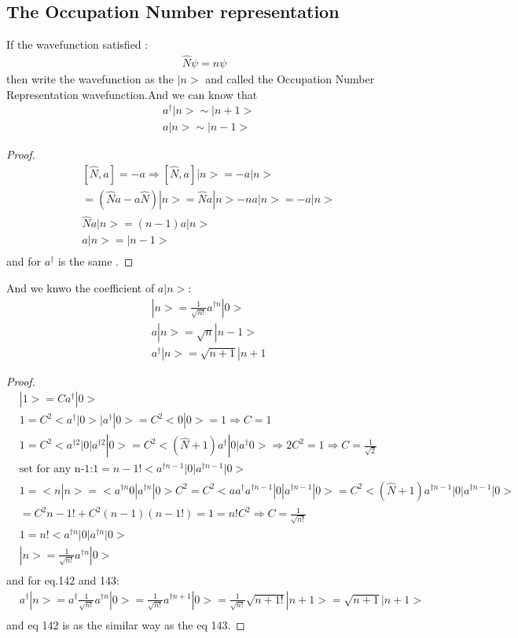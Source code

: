 \documentclass{article}
\begin{document}
\subsection{The Occupation Number representation}
If the wavefunction satisfied :
\begin{align}
\hat N \psi=n\psi
\end{align}
then write the wavefunction as the $|n>$ and called the Occupation Number Representation wavefunction.And we can know that
\begin{align}
&a^{\dagger}|n>\sim|n+1> \\
&a|n>\sim|n-1>
\end{align}

\begin{proof}
  \begin{align*}
  &[\hat N,a]=-a \Rightarrow [\hat N,a]|n>=-a|n>\\
  &=(\hat Na-a\hat N)|n>=\hat Na|n>-na|n>=-a|n> \\
  &\hat Na|n>=(n-1)a|n> \\
  &a|n>=|n-1> \\
  \end{align*}
  and for $a^{\dagger}$ is the same .
\end{proof}
And we knwo the coefficient of $a|n>$:
\begin{align}
  &|n>=\frac1{\sqrt{n!}}a^{\dagger n}|0> \\
  &a|n>=\sqrt{n}|n-1>\\
  &a^{\dagger}|n>=\sqrt{n+1}|n+1 
\end{align}

\begin{proof}
  \begin{align*}
    &|1>=Ca^{\dagger}|0> \\
    &1=C^2<a^{\dagger}|0>|a^{\dagger}|0>=C^2<0|0>=1\Rightarrow C=1 \\
    &1=C^2<a^{\dagger 2}|0|a^{\dagger 2}|0>=C^2<(\hat N+1)a^{\dagger }|0|a^{\dagger }0>\Rightarrow 2C^2=1\Rightarrow C=\frac1{\sqrt{2}} \\
    &\text{set for any n-1:}1={n-1!}<a^{\dagger n-1}|0|a^{\dagger n-1}|0> \\
    &1=<n|n>=<a^{\dagger n} 0|a^{\dagger n}|0>C^2=C^2<aa^{\dagger} a^{\dagger n-1}|0|a^{\dagger n-1}|0>=C^2<(\hat N+1)a^{\dagger n-1}|0|a^{\dagger n-1}|0> \\
    &=C^2 {n-1!}+C^2 (n-1)(n-1!)=1=n!C^2\Rightarrow C=\frac1{\sqrt{n!}} \\
    &1=n!<a^{\dagger n}|0|a^{\dagger n}|0> \\
    &|n>=\frac1{\sqrt{n!}}a^{\dagger n}|0> \\
  \end{align*}
  and for eq.142 and 143:
  \begin{align*}
  &a^{\dagger}|n>=a^{\dagger}\frac1{\sqrt{n!}}a^{\dagger n}|0>=\frac1{\sqrt{n!}}a^{\dagger n+1}|0>=\frac1{\sqrt{n!}}\sqrt{n+1!}|n+1>=\sqrt{n+1}|n+1> \\
  \end{align*}
  and eq 142 is as the similar way as the eq 143.
\end{proof}
\end{document}
